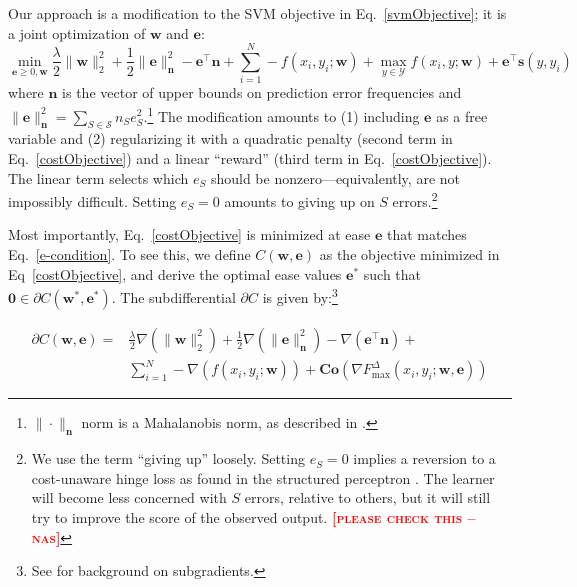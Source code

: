 \documentclass{article} %
\newcommand{\bmcomment}[1]{\textcolor{blue}{\textsc{\textbf{[#1 --bm]}}}}
\newcommand{\nascomment}[1]{\textcolor{red}{\textsc{\textbf{[#1 --nas]}}}}
\begin{document}
Our approach is a modification to the SVM objective in
Eq.~\ref{svmObjective}; it is a joint optimization of $\mathbf{w}$ and $\mathbf{e}$:
\begin{equation}
\label{costObjective}
\min_{\mathbf{e}\geq 0,\mathbf{w}} \frac{\lambda}{2}\|\mathbf{w}\|_2^2
+ \frac{1}{2} \|\mathbf{e}\|_{\mathbf{n}}^2 - \mathbf{e}^\top
\mathbf{n} + \sum_{i=1}^N -f(x_i,y_i; \mathbf{w})  + \max_{y \in
  \mathcal{Y}} f(x_i,y ; \mathbf{w}) + \mathbf{e}^\top \mathbf{s}(y, y_i)
\end{equation}
where $\mathbf{n}$ is the vector of upper bounds on prediction error
frequencies and 
$\|\mathbf{e}\|_{\mathbf{n}}^2 = \sum_{S \in
  \mathcal{S}} n_Se_S^2$.\footnote{$\|\cdot\|_{\mathbf{n}}$ norm is
  a Mahalanobis norm, as described in
  \citep{mahalanobis1936generalized}.} 
 The modification amounts to (1) including
$\mathbf{e}$ as a free variable and (2) regularizing it with a quadratic
penalty (second term in Eq.~\ref{costObjective}) and a linear ``reward''
(third term in Eq.~\ref{costObjective}).  The linear term selects
which $e_S$ should be nonzero---equivalently, are not impossibly
difficult. Setting $e_S=0$ amounts to giving up on $S$
errors.\footnote{We use the term ``giving up'' loosely.  Setting
  $e_S=0$ implies a reversion to a cost-unaware hinge loss as found in
  the structured perceptron \citep{collins2002discriminative}.  The
  learner will become less concerned with $S$ errors, relative to
  others, but it will still try to improve the score of the observed output.
\nascomment{please check this}}

Most importantly, Eq.~\ref{costObjective} is minimized at ease
 $\mathbf{e}$ 
that matches Eq.~\ref{e-condition}.  To see this, we define 
$C(\mathbf{w},\mathbf{e})$ as the objective minimized in 
Eq~\ref{costObjective}, and derive the optimal ease 
values $\mathbf{e}^*$
such that $\mathbf{0}\in \partial C(\mathbf{w}^*,\mathbf{e}^*)$.  
The subdifferential $\partial C$ is given by:\footnote{See
  \citep{subgradients} for background on subgradients.}

\begin{equation}
\label{subdifferential}
\begin{split}
\partial C(\mathbf{w},\mathbf{e}) = & \frac{\lambda}{2}\nabla (\|\mathbf{w}\|_2^2)
+\frac{1}{2}\nabla (\|\mathbf{e}\|^2_{\mathbf{n}})-\nabla (\mathbf{e}^\top \mathbf{n})
+ \\ 
& \sum_{i=1}^N -\nabla (f(x_i,y_i; \mathbf{w}))+ 
\mathbf{Co}(\nabla F^{\Delta}_{\max}(x_i,y_i;\mathbf{w},\mathbf{e}))
\end{split}
\end{equation}
\end{document}
